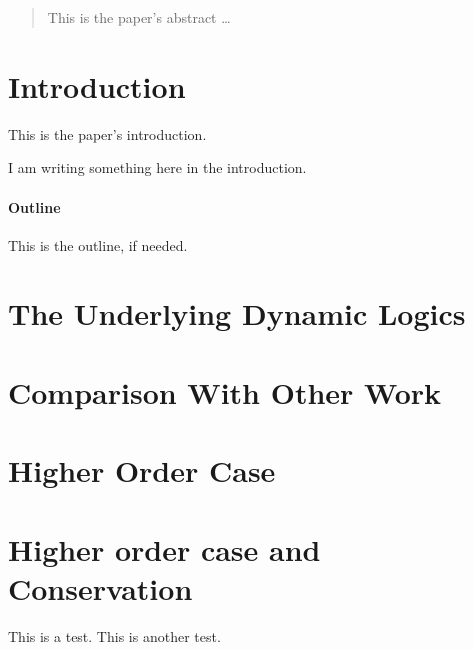 \documentclass[a4paper,12pt]{article}
\begin{document}
\maketitle

\begin{abstract}
This is the paper's abstract \ldots
\end{abstract}

\section{Introduction}
This is the paper's introduction.

I am writing something here in the introduction.

\paragraph{Outline}
This is the outline, if needed.

\section{The Underlying Dynamic Logics}


\section{Comparison With Other Work}

\section{Higher Order Case}


\section{Higher order case and Conservation}

This is a test. This is another test.




\end{document}
